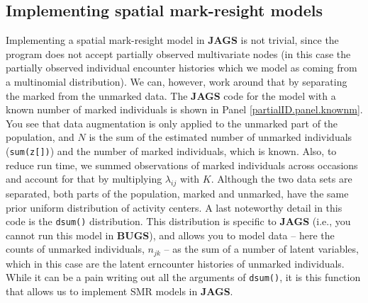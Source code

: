 \subsection{Implementing spatial mark-resight models}
Implementing a spatial mark-resight model in {\bf JAGS} is not
trivial, since the program does not accept partially observed
multivariate nodes (in this case the partially observed individual
encounter histories which we model as coming from a multinomial
distribution). We can, however, work around that by separating the marked from the unmarked data. The {\bf JAGS} code for the model with a known number of marked individuals is shown in Panel \ref{partialID.panel.knownm}. You see that data augmentation is only applied to the unmarked part of the population, and $N$ is the sum of the estimated number of unmarked individuals ({\tt sum(z[])}) and the number of marked individuals, which is known. Also, to reduce run time, we summed observations of marked individuals across occasions and account for that by multiplying $\lambda_{ij}$ with $K$. Although the two data sets are separated, both parts of the population, marked and unmarked, have the same prior uniform distribution of activity centers.
A last noteworthy detail in this code is the {\tt dsum()}
distribution. %
This distribution %
is specific to {\bf JAGS} (i.e., you cannot run this model in {\bf
  BUGS}), and allows you to model data -- here the counts of unmarked
individuals, $n_{jk}$ -- as the sum of a number of latent variables,
which in this case are
the latent erncounter histories of unmarked individuals. While it can be a pain writing out all the arguments of {\tt dsum()}, it is this function that allows us to implement SMR models in {\bf JAGS}.


